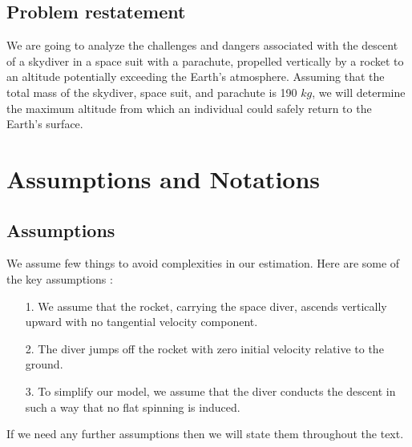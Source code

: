 \documentclass[a4paper, 14pt]{extarticle}
\begin{document}
\subsection{Problem restatement}
We are going to analyze the challenges and dangers associated with the descent of a skydiver in a space suit with a parachute, propelled vertically by a rocket to an altitude potentially exceeding the Earth's atmosphere. Assuming that the total mass of the skydiver, space suit, and parachute is 190 $kg$, we will determine the maximum altitude from which an individual could safely return to the Earth's surface.
\section{Assumptions and Notations}
\subsection{Assumptions}
We assume few things to avoid complexities in our estimation. Here are some of the key assumptions :
\begin{enumerate}
    \item[1.] We assume that the rocket, carrying the space diver, ascends vertically upward with no tangential velocity component.
    \item[2.] The diver jumps off the rocket with zero initial velocity relative to the ground.
    \item[3.] To simplify our model, we assume that the diver conducts the descent in such a way that no flat spinning is induced.
\end{enumerate}
If we need any further assumptions then we will state them throughout the text.
\end{document}
